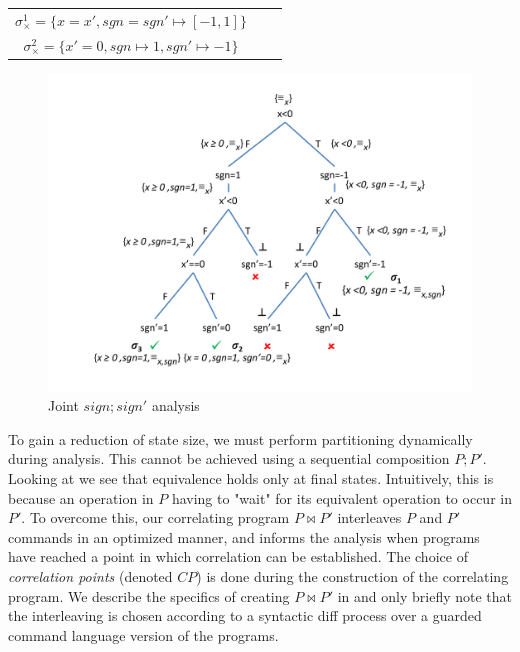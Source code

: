 
\vspace{0.1in}
\begin{tabular}{ccc}
\hspace{1cm} $\sigma_{\times}^1 = \{x = x', sgn = sgn' \mapsto [-1,1]\}$
\\
\hspace{1cm} $\sigma_{\times}^2 = \{x' = 0, sgn \mapsto 1, sgn' \mapsto -1\}$
\\
\end{tabular}
\vspace{0.1in}

\begin{figure}
\centering
\includegraphics[scale=0.38,clip=true,trim = 75pt 25pt 5pt 20pt]{figures/sign-graph-joint}
\caption{Joint $sign;sign'$ analysis}
\end{figure}



To gain a reduction of state size, we must perform partitioning dynamically during analysis. This cannot be achieved using a sequential composition $P;P'$. Looking at  we see that equivalence holds only at final states. Intuitively, this is because an operation in $P$ having to "wait" for its equivalent operation to occur in $P'$. To overcome this, our correlating program $P \bowtie P'$ interleaves $P$ and $P'$ commands in an optimized manner, and informs the analysis when programs have reached a point in which correlation can be established.
The choice of \emph{correlation points} (denoted $CP$) is done during the construction of the correlating program. We describe the specifics of creating $P \bowtie P'$ in  and only briefly note that the interleaving is chosen according to a syntactic diff process over a guarded command language version of the programs.

